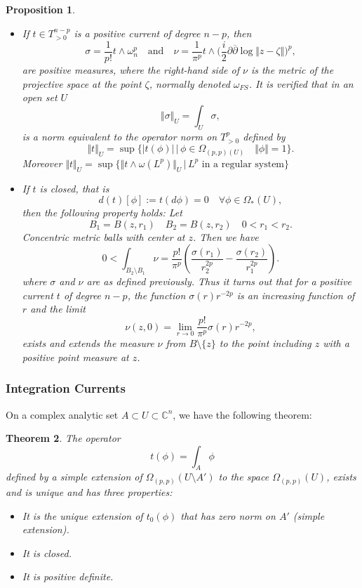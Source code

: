 \documentclass[12pt,twoside,a4paper]{report}
\newtheorem{theorem}{Theorem}[section]
\newtheorem{prop}[theorem]{Proposition}
\begin{document}
\begin{prop}
\begin{itemize}
        \item[4] If $t\in T^{n-p}_{>0}$ is a positive current of degree $n-p$, then
        \[
            \sigma=\frac{1}{p!}t\wedge\omega_n^{p}
            \quad\text{and}\quad
            \nu=\frac{1}{\pi^p}t\wedge\Big(\frac{i}{2}\partial\overline{\partial}\log\Vert z-\zeta\Vert\Big)^{p},
        \]
        are positive measures, where the right-hand side of $\nu$ is the metric of the projective space at the point $\zeta$, normally denoted $\omega_{FS}$. It is verified that in an open set $U$
        \[
            \Vert\sigma\Vert_{U}=\int_{U}\sigma,
        \]
        is a norm equivalent to the operator norm on $T^p_{>0}$ defined by
        \[
            \Vert t\Vert_U=\sup\{|t(\phi)|\,\vert\,\phi\in \Omega_{(p,p)(U)}\quad\Vert\phi\Vert=1\}.
        \]
        Moreover $\Vert t\Vert_U=\sup\{\Vert t\wedge\omega(L^{p})\Vert_U\,\vert\,L^{p}\text{ in a regular system}\}$
        \item[5] If $t$ is closed, that is
        \[
            d(t)[\phi]:=t(d\phi)=0\quad\forall\phi\in\Omega_{*}(U),
        \]
        then the following property holds: Let
        \[
            B_1=B(z,r_1)\quad B_2=B(z,r_2)\quad 0<r_1<r_2.
        \]
        Concentric metric balls with center at $z$. Then we have
        \[
            0<\int_{B_2\setminus B_1}\nu= \frac{p!}{\pi^{p}}(\frac{\sigma(r_1)}{r^{2p}_2}-\frac{\sigma(r_2)}{r^{2p}_1}).
        \]
        where $\sigma$ and $\nu$ are as defined previously. Thus it turns out that for a positive current $t$ of degree $n-p$, the function $\sigma(r)r^{-2p}$ is an increasing function of $r$ and the limit
        \[
            \nu(z,0)=\lim_{r\rightarrow 0}\frac{p!}{\pi^{p}}\sigma(r)r^{-2p},
        \]
        exists and extends the measure $\nu$ from $B\setminus\{z\}$ to the point including $z$ with a positive point measure at $z$.
    \end{itemize}
\end{prop}


\subsubsection{Integration Currents}
\label{sec:org9982aa5}
On a complex analytic set $A\subset U\subset\mathbb{C}^n$, we have the following theorem:

\begin{theorem}
The operator
\[
    t(\phi)=\int_A\phi
\]
defined by a simple extension of $\Omega_{(p,p)}(U\setminus A')$ to the space $\Omega_{(p,p)}(U)$, exists and is unique and has three properties:
\begin{itemize}
    \item[a] It is the unique extension of $t_0(\phi)$ that has zero norm on $A'$ (simple extension).
    \item[b] It is closed.
    \item[c] It is positive definite.
\end{itemize}
\end{theorem}
\end{document}
